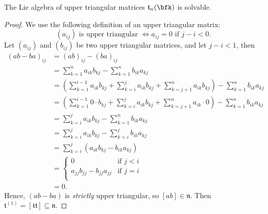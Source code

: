 \documentclass{article}
\newcommand{\lb}[1]{\ensuremath{\left[{#1}\right]}}
\newcommand*\talg{\ensuremath{\mathfrak{t}}}
\newcommand*\nalg{\ensuremath{\mathfrak{n}}}
\begin{document}
\begin{proposition}
    The Lie algebra of upper triangular matrices $\talg_n(\bfk)$ is solvable.
\end{proposition}
\begin{proof}
    We use the following definition of an upper triangular matrix:
    \[
        (a_{ij}) \text{ is upper triangular }
        \iff
        a_{ij} = 0 \text{ if } j - i < 0.
    \]
    Let $(a_{ij})$ and $(b_{ij})$ be two upper triangular matrices, and let $j - i < 1$, then
    \begin{align*}
        (ab - ba)_{ij}
        &=
        (ab)_{ij}
        -
        (ba)_{ij}
        \\
        &=
        \sum_{k=1}^n
        a_{ik}b_{kj}
        -
        \sum_{k=1}^n
        b_{ik}a_{kj}
        \\
        &=
        \left(
            \sum_{k=1}^{i-1}
            a_{ik}b_{kj}
            +
            \sum_{k=i}^j
            a_{ik}b_{kj}
            +
            \sum_{k=j+1}^n
            a_{ik}b_{kj}
        \right)
        -
        \sum_{k=1}^n
        b_{ik}a_{kj}
        \\
        &=
        \left(
            \sum_{k=1}^{i-1}
            0 \cdot b_{kj}
            +
            \sum_{k=i}^j
            a_{ik}b_{kj}
            +
            \sum_{k=j+1}^n
            a_{ik} \cdot 0
        \right)
        -
        \sum_{k=1}^n
        b_{ik}a_{kj}
        \\
        &=
        \sum_{k=i}^j
        a_{ik}b_{kj}
        -
        \sum_{k=1}^n
        b_{ik}a_{kj}
        \\
        &=
        \sum_{k=i}^j
        a_{ik}b_{kj}
        -
        \sum_{k=i}^j
        b_{ik}a_{kj}
        \\
        &=
        \sum_{k=i}^j
        (a_{ik}b_{kj} - b_{ik}a_{kj})
        \\
        &=
        \begin{cases}
            0 & \text{if }j < i \\
            a_{jj}b_{jj} - b_{jj}a_{jj} & \text{if }j = i \\
        \end{cases}
        \\
        &=
        0.
    \end{align*}
    Hence, $(ab - ba)$ is \textit{strictly} upper triangular, so $\lb{ab} \in \nalg$.
    Then $\talg^{(1)} = \lb{\talg\talg} \subseteq \nalg$.


\end{proof}
\end{document}
